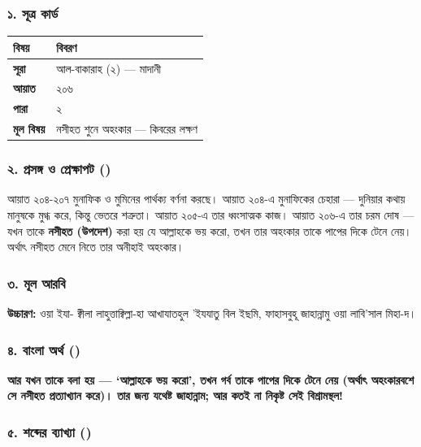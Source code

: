 \subsubsection*{১. সূত্র কার্ড}

\begin{table}[h]\centering\small
\begin{tabular}{ll}
বিষয় & বিবরণ \\
\hline
\textbf{সূরা} & আল-বাকারাহ (২) — মাদানী \\
\textbf{আয়াত} & ২০৬ \\
\textbf{পারা} & ২ \\
\textbf{মূল বিষয়} & নসীহত শুনে অহংকার — কিবরের লক্ষণ \\
\hline
\end{tabular}
\end{table}

\subsubsection*{২. প্রসঙ্গ ও প্রেক্ষাপট ()}

আয়াত ২০৪-২০৭ মুনাফিক ও মুমিনের পার্থক্য বর্ণনা করছে। আয়াত ২০৪-এ মুনাফিকের চেহারা — দুনিয়ার কথায় মানুষকে মুগ্ধ করে, কিন্তু ভেতরে শত্রুতা। আয়াত ২০৫-এ তার ধ্বংসাত্মক কাজ। আয়াত ২০৬-এ তার চরম দোষ — যখন তাকে \textbf{নসীহত (উপদেশ)} করা হয় যে আল্লাহকে ভয় করো, তখন তার অহংকার তাকে পাপের দিকে টেনে নেয়। অর্থাৎ নসীহত মেনে নিতে তার অনীহাই অহংকার।

\subsubsection*{৩. মূল আরবি}
\begin{center}\end{center}
\textbf{উচ্চারণ:} ওয়া ইযা- ক্বীলা লাহুত্তাক্বিল্লা-হা আখাযাতহুল 'ইযযাতু বিল ইছমি, ফাহাসবুহূ জাহান্নামু ওয়া লাবি'সাল মিহা-দ।

\subsubsection*{৪. বাংলা অর্থ ()}
\textbf{আর যখন তাকে বলা হয় — ‘আল্লাহকে ভয় করো’, তখন গর্ব তাকে পাপের দিকে টেনে নেয় (অর্থাৎ অহংকারবশে সে নসীহত প্রত্যাখ্যান করে)। তার জন্য যথেষ্ট জাহান্নাম; আর কতই না নিকৃষ্ট সেই বিশ্রামস্থল!}

\subsubsection*{৫. শব্দের ব্যাখ্যা ()}

